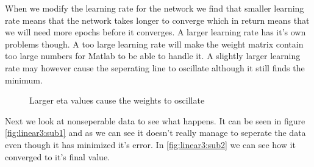 \documentclass[a4paper,11pt]{article}
\begin{document}
When we modify the learning rate for the network we find that smaller learning rate means that the network takes longer to converge which in return means that we will need more epochs before it converges. A larger learning rate has it's own problems though. A too large learning rate will make the weight matrix contain too large numbers for Matlab to be able to handle it. A slightly larger learning rate may however cause the seperating line to oscillate although it still finds the minimum.

\begin{figure}[h!]
\caption{Larger eta values cause the weights to oscillate}
\end{figure}

Next we look at nonseperable data to see what happens. It can be seen in figure \ref{fig:linear3:sub1} and as we can see it doesn't really manage to seperate the data even though it has minimized it's error. In \ref{fig:linear3:sub2} we can see how it converged to it's final value.
\end{document}
